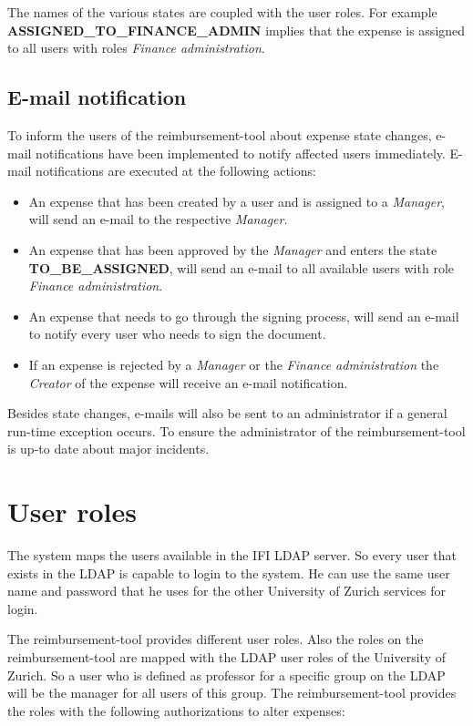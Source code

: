 The names of the various states are coupled with the user roles. For example \textbf{ASSIGNED\_TO\_FINANCE\_ADMIN} implies that the expense is assigned to all users with roles \textit{Finance administration}.

\subsection{E-mail notification}
To inform the users of the reimbursement-tool about expense state changes, e-mail notifications have been implemented to notify affected users immediately. E-mail notifications are executed at the following actions:
\begin{itemize}
    \item An expense that has been created by a user and is assigned to a \textit{Manager}, will send an e-mail to the respective \textit{Manager}.
    \item An expense that has been approved by the \textit{Manager} and enters the state \newline \textbf{TO\_BE\_ASSIGNED}, will send an e-mail to all available users with role \textit{Finance administration}.
    \item An expense that needs to go through the signing process, will send an e-mail to notify every user who needs to sign the document.
    \item If an expense is rejected by a \textit{Manager} or the \textit{Finance administration} the \textit{Creator} of the expense will receive an e-mail notification.
\end{itemize}

Besides state changes, e-mails will also be sent to an administrator if a general run-time exception occurs. To ensure the administrator of the reimbursement-tool is up-to date about major incidents.


\section{User roles}
\label{user-roles}

The system maps the users available in the IFI LDAP server. So every user that exists in the LDAP is capable to login to the system. He can use the same user name and password that he uses for the other University of Zurich services for login. \par

The reimbursement-tool provides different user roles. Also the roles on the reimbursement-tool are mapped with the LDAP user roles of the University of Zurich. So a user who is defined as professor for a specific group on the LDAP will be the manager for all users of this group. The reimbursement-tool provides the roles with the following authorizations to alter expenses:

